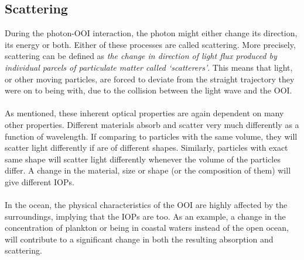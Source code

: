 \subsection{Scattering}
During the photon-OOI interaction, the photon might either change its direction, its energy or both. Either of these processes are called scattering. %
More precisely, scattering can be defined as \textit{the change in direction of light flux produced by individual parcels of particulate matter called ‘scatterers’}. This means that light, or other moving particles, are forced to deviate from the straight trajectory they were on to being with, due to the collision between the light wave and the OOI. 
\\\\
As mentioned, these inherent optical properties are again dependent on many other properties. Different materials absorb and scatter very much differently as a function of wavelength. If comparing to particles with the same volume, they will scatter light differently if are of different shapes. Similarly, particles with exact same shape will scatter light differently whenever the volume of the particles differ. A change in the material, size or shape (or the composition of them) will give different IOPs. 
\\\\
In the ocean, the physical characteristics of the OOI are highly affected by the surroundings, implying that the IOPs are too. As an example, a change in the concentration of plankton or being in coastal waters instead of the open ocean, will contribute to a significant change in both the resulting absorption and scattering. 


